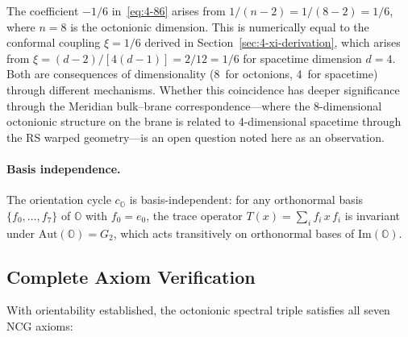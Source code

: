 \begin{remark}
The coefficient $-1/6$ in~\eqref{eq:4-86} arises from $1/(n - 2) = 1/(8 - 2) = 1/6$, where $n = 8$ is the octonionic dimension. This is numerically equal to the conformal coupling $\xi = 1/6$ derived in Section~\ref{sec:4-xi-derivation}, which arises from $\xi = (d - 2)/[4(d - 1)] = 2/12 = 1/6$ for spacetime dimension $d = 4$. Both are consequences of dimensionality (8~for octonions, 4~for spacetime) through different mechanisms. Whether this coincidence has deeper significance through the Meridian bulk--brane correspondence---where the 8-dimensional octonionic structure on the brane is related to 4-dimensional spacetime through the RS warped geometry---is an open question noted here as an observation.
\end{remark}

\paragraph{Basis independence.}
The orientation cycle $c_{\mathbb{O}}$ is basis-independent: for any orthonormal basis $\{f_0, \ldots, f_7\}$ of $\mathbb{O}$ with $f_0 = e_0$, the trace operator $T(x) = \sum_i f_i\, x\, f_i$ is invariant under $\mathrm{Aut}(\mathbb{O}) = G_2$, which acts transitively on orthonormal bases of $\mathrm{Im}(\mathbb{O})$.


\subsection{Complete Axiom Verification}
\label{sec:4-axiom-table}

With orientability established, the octonionic spectral triple satisfies all seven NCG axioms:

